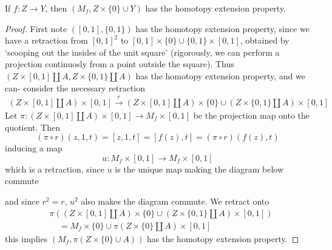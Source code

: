 \begin{lemma}
    If $f:Z \to Y$, then $(M_f, Z \times \{ 0 \} \cup Y)$ has the homotopy extension property.
\end{lemma}
\begin{proof}
        First note $([0,1], \{ 0, 1 \})$ has the homotopy extension property, since we have a retraction from $[0,1]^2$ to $[0,1] \times \{ 0 \} \cup \{ 0,1 \} \times [0,1]$, obtained by `scooping out the insides of the unit square' (rigorously, we can perform a projection continuosly from a point outside the square). Thus $(Z \times [0,1] \coprod A, Z \times \{ 0, 1 \} \coprod A)$ has the homotopy extension property, and we can- consider the necessary retraction
    \begin{align*}
        (Z \times [0,1] \coprod A) \times [0,1] \xrightarrow{r} (Z \times [0,1] \coprod A) \times \{ 0 \} \cup (Z \times \{ 0, 1 \} \coprod A) \times [0,1]
    \end{align*}
    Let $\pi: (Z \times [0,1] \coprod A) \times [0,1] \to M_f \times [0,1]$ be the projection map onto the quotient. Then
    \[ (\pi \circ r)(z,1,t) = [z,1,t] = [f(z),t] = (\pi \circ r)(f(z),t) \]
    inducing a map
    \[ u: M_f \times [0,1] \to M_f \times [0,1] \]
    which is a retraction, since $u$ is the unique map making the diagram below commute
    \begin{center}
    \end{center}
    and since $r^2 = r$, $u^2$ also makes the diagram commute. We retract onto
    \begin{align*}
        &\pi((Z \times [0,1] \coprod A) \times \{ 0 \} \cup (Z \times \{ 0, 1 \} \coprod A) \times [0,1])\\
        &\ \ \ \ \ = M_f \times \{ 0 \} \cup \pi(Z \times \{ 0 \} \coprod A) \times [0,1]
    \end{align*}
    this implies $(M_f, \pi(Z \times \{ 0 \} \cup A))$ has the homotopy extension property.
\end{proof}

